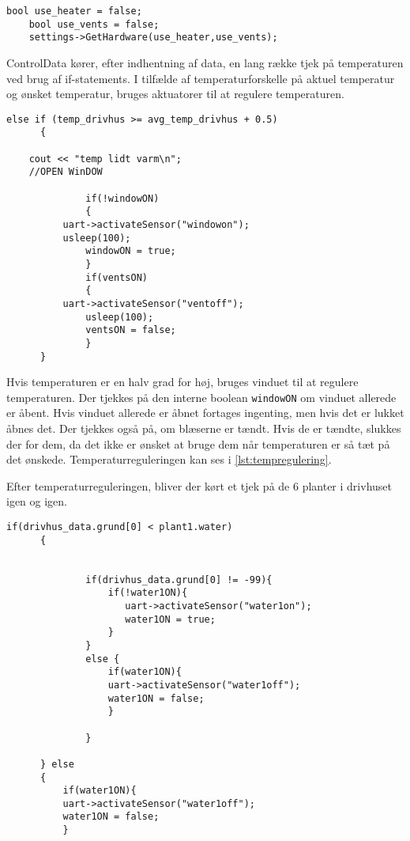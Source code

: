 \begin{lstlisting}[caption=Implementering af getHardware metoden., label=lst:Regulator_getHardware]
    bool use_heater = false; 
    bool use_vents = false; 
    settings->GetHardware(use_heater,use_vents);
\end{lstlisting}

ControlData kører, efter indhentning af data, en lang række tjek på temperaturen ved brug af if-statements. I tilfælde af temperaturforskelle på aktuel temperatur og ønsket temperatur, bruges aktuatorer til at regulere temperaturen.

\begin{lstlisting}[caption=Eksempel på if-statements i regulator., label=regulator_ifstats]
else if (temp_drivhus >= avg_temp_drivhus + 0.5)
      {

	cout << "temp lidt varm\n";
	//OPEN WinDOW

              if(!windowON)
              {
	      uart->activateSensor("windowon");
	      usleep(100);
              windowON = true;
              }
              if(ventsON)
              {
	      uart->activateSensor("ventoff");
              usleep(100);
              ventsON = false;
              }
      }
\end{lstlisting}

Hvis temperaturen er en halv grad for høj, bruges vinduet til at regulere temperaturen. Der tjekkes på den interne boolean \texttt{windowON} om vinduet allerede er åbent. Hvis vinduet allerede er åbnet fortages ingenting, men hvis det er lukket åbnes det.
Der tjekkes også på, om blæserne er tændt. Hvis de er tændte, slukkes der for dem, da det ikke er ønsket at bruge dem når temperaturen er så tæt på det ønskede. Temperaturreguleringen kan ses i \ref{lst:tempregulering}.

Efter temperaturreguleringen, bliver der kørt et tjek på de 6 planter i drivhuset igen og igen.

\begin{lstlisting}[caption=Temperaturregulering., label=lst:tempregulering]
if(drivhus_data.grund[0] < plant1.water)
      {


              if(drivhus_data.grund[0] != -99){
                  if(!water1ON){
                     uart->activateSensor("water1on");
                     water1ON = true;
                  }
              }
              else {
                  if(water1ON){
                  uart->activateSensor("water1off");
                  water1ON = false;
                  }

              }

      } else
      {
          if(water1ON){
          uart->activateSensor("water1off");
          water1ON = false;
          }
\end{lstlisting}

